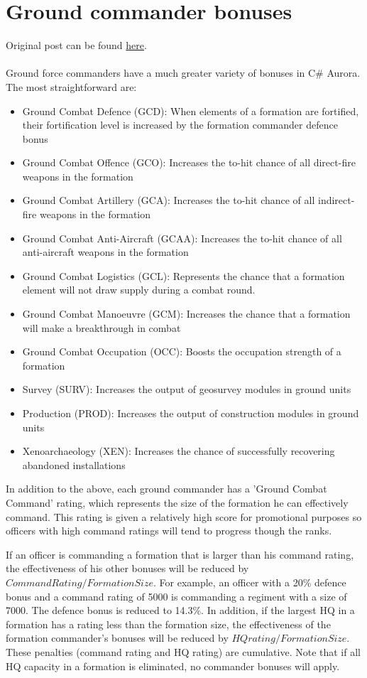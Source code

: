 \documentclass[../../Aurora C# unofficial manual.tex]{subfiles}
\begin{document}
	\section{Ground commander bonuses}
	Original post can be found
	\href{http://aurora2.pentarch.org/index.php?topic=8495.msg110196#msg110196}{here}.
	\\\\
	
	Ground force commanders have a much greater variety of bonuses in C\# Aurora. The most straightforward are:
	\begin{itemize}
		\item Ground Combat Defence (GCD): When elements of a formation are fortified, their fortification level is increased by the formation commander defence bonus
		\item Ground Combat Offence (GCO): Increases the to-hit chance of all direct-fire weapons in the formation
		\item Ground Combat Artillery (GCA): Increases the to-hit chance of all indirect-fire weapons in the formation
		\item Ground Combat Anti-Aircraft (GCAA): Increases the to-hit chance of all anti-aircraft weapons in the formation
		\item Ground Combat Logistics (GCL): Represents the chance that a formation element will not draw supply during a combat round.
		\item Ground Combat Manoeuvre (GCM): Increases the chance that a formation will make a breakthrough in combat
		\item Ground Combat Occupation (OCC): Boosts the occupation strength of a formation
		\item Survey (SURV): Increases the output of geosurvey modules in ground units
		\item Production (PROD): Increases the output of construction modules in ground units
		\item Xenoarchaeology (XEN): Increases the chance of successfully recovering abandoned installations
	\end{itemize}

	In addition to the above, each ground commander has a 'Ground Combat Command' rating, which represents the size of the formation he can effectively command. This rating is given a relatively high score for promotional purposes so officers with high command ratings will tend to progress though the ranks.
	
	If an officer is commanding a formation that is larger than his command rating, the effectiveness of his other bonuses will be reduced by \( Command Rating / Formation Size \). For example, an officer with a 20\% defence bonus and a command rating of 5000 is commanding a regiment with a size of 7000. The defence bonus is reduced to 14.3\%. In addition, if the largest HQ in a formation has a rating less than the formation size, the effectiveness of the formation commander's bonuses will be reduced by \( HQ rating / Formation Size \). These penalties (command rating and HQ rating) are cumulative. Note that if all HQ capacity in a formation is eliminated, no commander bonuses will apply.
	
\end{document}
